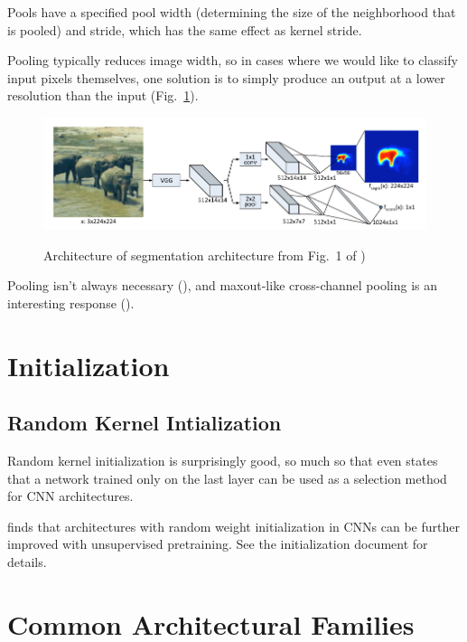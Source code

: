 \documentclass{article}
\begin{document}
Pools have a specified pool width (determining the size of the neighborhood that is pooled) and stride, which has the same effect as kernel stride.

Pooling typically reduces image width, so in cases where we would like to classify input pixels themselves, one solution is to simply produce an output at a lower resolution than the input (Fig.~\ref{fig:pinheiro}).

\begin{figure}[!h]
\centering
{\includegraphics[width=\textwidth]{pinheiro.pdf}}
\caption{Architecture of segmentation architecture from Fig.~1 of )}
\label{fig:pinheiro}
\end{figure}

Pooling isn't always necessary (), and maxout-like cross-channel pooling is an interesting response ().

\section{Initialization}

\subsection{Random Kernel Intialization}

Random kernel initialization is surprisingly good, so much so that  even states that a network trained only on the last layer can be used as a selection method for CNN architectures.

 finds that architectures with random weight initialization in CNNs can be further improved with unsupervised pretraining. See the initialization document for details.

\section{Common Architectural Families}
\end{document}
